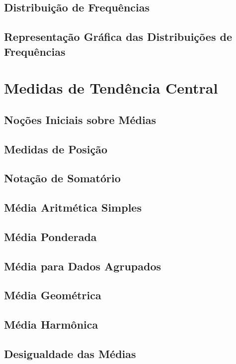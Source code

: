 \documentclass[a4paper,12pt]{book}
\theoremstyle{definition} %
\theoremstyle{definition}
\begin{document}
\section{Distribuição de Frequências}

\section{Representação Gráfica das Distribuições de Frequências}

\chapter{Medidas de Tendência Central}
\section{Noções Iniciais sobre Médias}

\section{Medidas de Posição}

\section{Notação de Somatório}

\section{Média Aritmética Simples}

\section{Média Ponderada}

\section{Média para Dados Agrupados}

\section{Média Geométrica}

\section{Média Harmônica}

\section{Desigualdade das Médias}   

\end{document}
